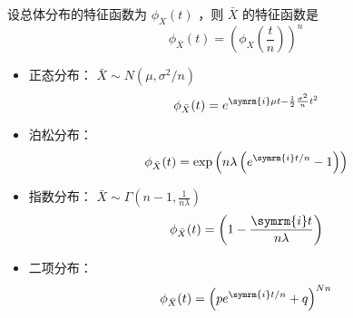  设总体分布的特征函数为 $ \phi_X(t) $ ，则 $ \bar{X} $ 的特征函数是
\begin{equation}
    \phi_{\bar{X}}(t) = \left(\phi_X\left(\frac{t}{n}\right)\right)^n
\end{equation}
\begin{itemize}[leftmargin=\paritemindent]
    \item 正态分布： $ \bar{X} \sim N(\mu, \sigma^2 / n) $
    $$ \phi_{\bar{X}}(t) = e^{\symrm{i}\mu t - \frac{1}{2} \frac{\sigma^2}{n} t^2} $$
    \item 泊松分布：
    $$ \phi_{\bar{X}}(t) = \exp \left( n\lambda \left(e^{\symrm{i}t/n} - 1\right) \right) $$
    \item 指数分布： $ \bar{X} \sim \Gamma \left(n-1, \frac{1}{n\lambda}\right) $
    $$ \phi_{\bar{X}}(t) = \left( 1 - \frac{\symrm{i}t}{n\lambda} \right) $$
    \item 二项分布：
    $$ \phi_{\bar{X}}(t) = \left( p e^{\symrm{i}t/n} + q \right)^{Nn} $$
\end{itemize}


